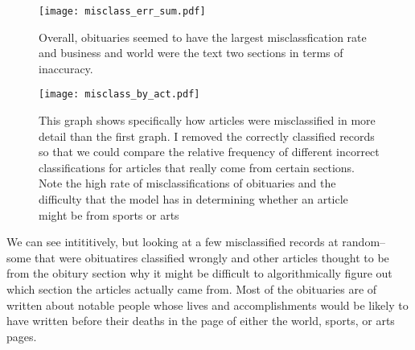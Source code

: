 \documentclass{article}
\begin{document}
\begin{figure}[H]
\begin{center}
\texttt{[image: misclass\_err\_sum.pdf]}
\caption{Overall, obituaries seemed to have the largest misclassfication rate and business and world were the text two sections in terms of inaccuracy.}
\end{center}
\end{figure}

\begin{figure}[H]
\begin{center}
\texttt{[image: misclass\_by\_act.pdf]}
\caption{This graph shows specifically how articles were misclassified in more detail than the first graph.  I removed the correctly classified records so that we could compare the relative frequency of different incorrect classifications for articles that really come from certain sections.  Note the high rate of misclassifications of obituaries and the difficulty that the model has in determining whether an article might be from sports or arts}
\end{center}
\end{figure}


We can see intititively, but looking at a few misclassified records at random-- some that were obituatires classified wrongly and other articles thought to be from the obitury section why it might be difficult to algorithmically figure out which section the articles actually came from.  Most of the obituaries are of written about notable people whose lives and accomplishments would be likely to have written before their deaths in the page of either the world, sports, or arts pages.  
\end{document}
